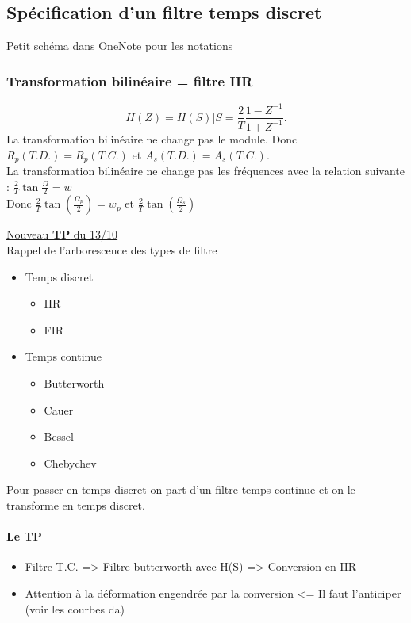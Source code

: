 \documentclass{article}
\theoremstyle{plain}%
\theoremstyle{definition}
\theoremstyle{remark}
\begin{document}
\subsection{Spécification d'un filtre temps discret}
Petit schéma dans OneNote pour les notations

\subsubsection{Transformation bilinéaire = filtre IIR}
\[
    H(Z) = H(S) | S = \frac{2}{T} \frac{1 - Z^{-1}}{1 + Z^{-1}}
.\]
La transformation bilinéaire ne change pas le module. Donc $ R_p (T.D.) = R_p(T.C.) $ et $ A_s(T.D.) = A_s(T.C.) $. \\
La transformation bilinéaire ne change pas les fréquences avec la relation suivante : $ \frac{2}{T} \tan \frac{\Omega }{2} = w $ \\
Donc $ \frac{2}{T}\tan (\frac{\Omega_p}{2}) = w_p $ et $ \frac{2}{T} \tan (\frac{\Omega _s}{2}) $ 

\underline{Nouveau \textbf{TP} du 13/10} \\
Rappel de l'arborescence des types de filtre
\begin{itemize}
    \item Temps discret \begin{itemize}
        \item IIR
        \item FIR
    \end{itemize}
    \item Temps continue\begin{itemize}
        \item Butterworth
        \item Cauer
        \item Bessel
        \item Chebychev
    \end{itemize}
\end{itemize}
Pour passer en temps discret on part d'un filtre temps continue et on le transforme en temps discret.

\paragraph*{Le TP}
\begin{itemize}
    \item Filtre T.C. => Filtre butterworth avec H(S) => Conversion en IIR
    \item Attention à la déformation engendrée par la conversion <= Il faut l'anticiper (voir les courbes da)
\end{itemize}
\end{document}
